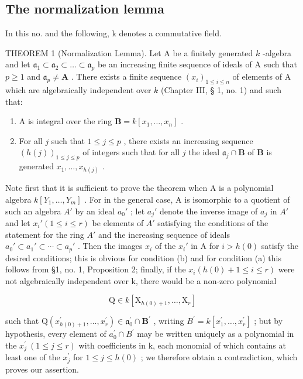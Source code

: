 \subsection{The normalization lemma}

In this no. and the following, k denotes a commutative field.

THEOREM 1 (Normalization Lemma). Let A be a finitely generated \(k\) -algebra and let \(\mathfrak{a}_1 \subset \mathfrak{a}_2 \subset \ldots \subset \mathfrak{a}_p\) be an increasing finite sequence of ideals of A such that \(p \geqslant 1\) and \(\mathfrak{a}_p \neq \mathbf{A}\) . There exists a finite sequence \((x_i)_{1 \leqslant i \leqslant n}\) of elements of A which are algebraically independent over \(k\) (Chapter III, § 1, no. 1) and such that:

\begin{enumerate}
\def\labelenumi{(\alph{enumi})}
\item
  A is integral over the ring \(\mathbf{B} = k[x_1, \ldots, x_n]\) .
\item
  For all \(j\) such that \(1 \leqslant j \leqslant p\) , there exists an increasing sequence \((h(j))_{1 \leqslant j \leqslant p}\) of integers such that for all \(j\) the ideal \(\mathfrak{a}_j \cap \mathbf{B}\) of \(\mathbf{B}\) is generated \(x_1, \ldots, x_{h(j)}\) .
\end{enumerate}

Note first that it is sufficient to prove the theorem when A is a polynomial algebra \(k[Y_{1},\ldots,Y_{m}]\) . For in the general case, A is isomorphic to a quotient of such an algebra \(A'\) by an ideal \(a_{0}'\) ; let \(a_{j}'\) denote the inverse image of \(a_{j}\) in \(A'\) and let \(x_{i}'(1\leqslant i\leqslant r)\) be elements of \(A'\) satisfying the conditions of the statement for the ring \(A'\) and the increasing sequence of ideals \(a_{0}'\subset a_{1}'\subset\cdots\subset a_{p}'\) . Then the images \(x_{i}\) of the \(x_{i}'\) in A for \(i>h(0)\) satisfy the desired conditions; this is obvious for condition (b) and for condition (a) this follows from §1, no. 1, Proposition 2; finally, if the \(x_{i}(h(0)+1\leqslant i\leqslant r)\) were not algebraically independent over k, there would be a non-zero polynomial

\[
\mathrm{Q} \in k [ \mathrm{X} _ {h (0) + 1}, \dots , \mathrm{X} _ {r} ]
\]

such that \(\mathrm{Q}(x_{h(0)+1}^{\prime},\ldots,x_{r}^{\prime})\in\mathfrak{a}_{0}^{\prime}\cap\mathbf{B}^{\prime}\) , writing \(B^{\prime}=k[x_{1}^{\prime},\ldots,x_{r}^{\prime}]\) ; but by hypothesis, every element of \(a_{0}^{\prime}\cap B^{\prime}\) may be written uniquely as a polynomial in the \(x_{j}^{\prime}\ (1\leqslant j\leqslant r)\) with coefficients in k, each monomial of which contains at least one of the \(x_{j}^{\prime}\) for \(1\leqslant j\leqslant h(0)\) ; we therefore obtain a contradiction, which proves our assertion.

